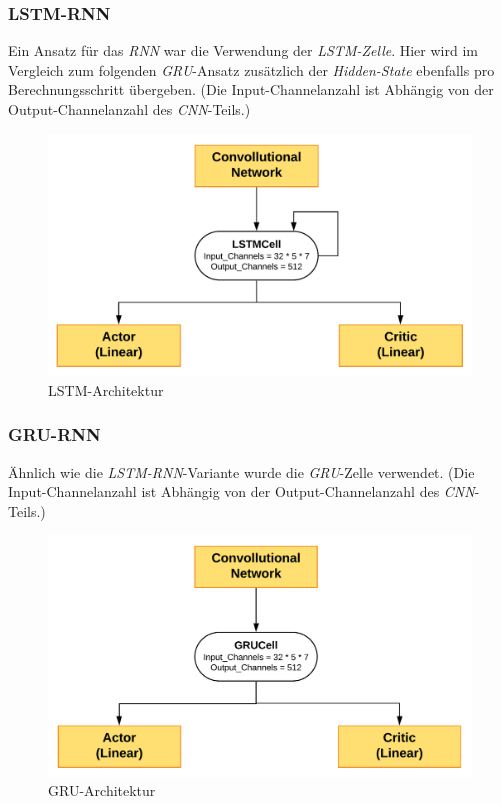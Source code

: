\documentclass[sigconf,nonacm]{acmart}
\begin{document}
\subsubsection{LSTM-RNN}\hfill \break
Ein Ansatz für das \textit{RNN} war die Verwendung der \textit{LSTM-Zelle}. Hier wird im Vergleich zum folgenden \textit{GRU}-Ansatz zusätzlich der \textit{Hidden-State} ebenfalls pro Berechnungsschritt übergeben. (Die Input-Channelanzahl ist Abhängig von der Output-Channelanzahl des \textit{CNN}-Teils.)

\begin{figure}[hbt!]
\includegraphics[scale=0.125]{Netzwerk_Architektur_lstm.png}
\caption{LSTM-Architektur}
\end{figure}

\subsubsection{GRU-RNN}\hfill \break

Ähnlich wie die \textit{LSTM-RNN}-Variante wurde die \textit{GRU}-Zelle verwendet. (Die Input-Channelanzahl ist Abhängig von der Output-Channelanzahl des \textit{CNN}-Teils.)

\begin{figure}[hbt!]
\includegraphics[scale=0.125]{Netzwerk_Architektur_gru.png}
\caption{GRU-Architektur}
\end{figure}
\end{document}
